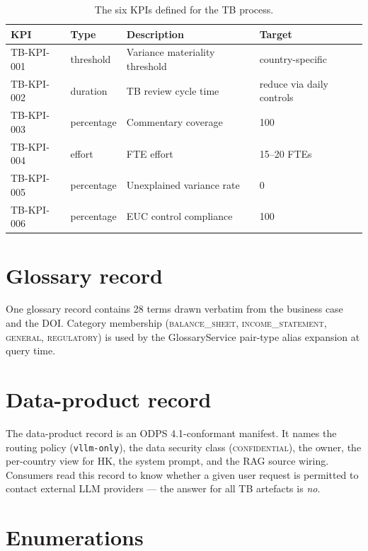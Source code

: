 \documentclass[11pt,a4paper,twoside]{report}
\begin{document}
\begin{table}[htbp]
\caption{The six KPIs defined for the TB process.}\label{tab:kpis}
\centering
\small
\begin{tabularx}{\linewidth}{@{}llXl@{}}
\toprule
\textbf{KPI} & \textbf{Type} & \textbf{Description} & \textbf{Target} \\ \midrule
TB-KPI-001 & threshold  & Variance materiality threshold       & country-specific \\
TB-KPI-002 & duration   & TB review cycle time                 & reduce via daily controls \\
TB-KPI-003 & percentage & Commentary coverage                  & 100 \\
TB-KPI-004 & effort     & FTE effort                           & 15--20 FTEs \\
TB-KPI-005 & percentage & Unexplained variance rate            & 0 \\
TB-KPI-006 & percentage & EUC control compliance               & 100 \\
\bottomrule
\end{tabularx}
\end{table}

\section{Glossary record}

One glossary record contains 28 terms drawn verbatim from the
business case and the DOI. Category membership
(\textsc{balance\_sheet}, \textsc{income\_statement}, \textsc{general},
\textsc{regulatory}) is used by the GlossaryService pair-type alias
expansion at query time.

\section{Data-product record}

The data-product record is an ODPS 4.1-conformant manifest. It names
the routing policy (\texttt{vllm-only}), the data security class
(\textsc{confidential}), the owner, the per-country view for HK, the
system prompt, and the RAG source wiring. Consumers read this record
to know whether a given user request is permitted to contact external
LLM providers --- the answer for all TB artefacts is \emph{no}.

\section{Enumerations}
\end{document}
